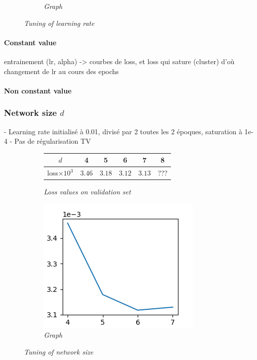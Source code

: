 \documentclass{article}
\begin{document}
\begin{figure}[!ht]
\begin{subfigure}{.33\linewidth}
                \caption{\textit{Graph}}
            \end{subfigure}
            \caption{\textit{Tuning of learning rate}}
        \end{figure}


        \paragraph{Constant value}
    entrainement (lr, alpha) -> courbes de loss, et loss qui sature (cluster) d'où changement de lr au cours des epochs
        \paragraph{Non constant value}
        \subsubsection{Network size $d$}
        - Learning rate initialisé à 0.01, divisé par 2 toutes les 2 époques, saturation à 1e-4
        - Pas de régularisation TV
        \begin{figure}[!ht]
            \begin{subfigure}{.49\linewidth}
                \center
                \begin{tabular}{|c|c|c|c|c|c|}
                    \hline
                    $d$ & 4 & 5 & 6 & 7 & 8 \\
                    \hline \hline
                    loss$\times 10^3$ & $3.46$ & $3.18$ & $3.12$ & $3.13$ & ??? \\
                    \hline
                \end{tabular}
                \caption{\textit{Loss values on validation set}}
            \end{subfigure}
            \begin{subfigure}{.49\linewidth}
                \centering
                \includegraphics[width=.8\linewidth]{pics/hpp-d.png}
                \caption{\textit{Graph}}
            \end{subfigure}
            \caption{\textit{Tuning of network size}}
        \end{figure}
\end{document}
